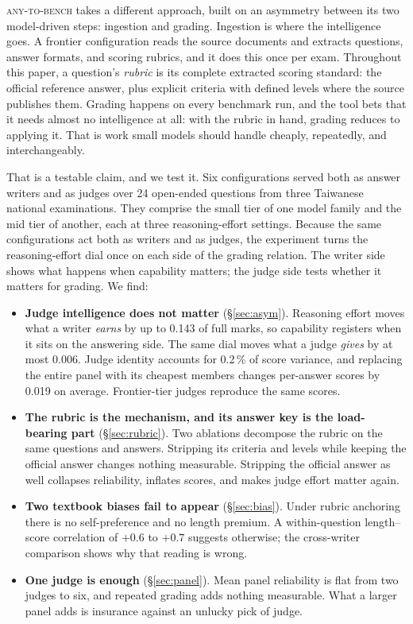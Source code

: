 \documentclass{article}
\begin{document}
\textsc{any-to-bench} takes a different approach, built on an asymmetry
between its two model-driven steps: ingestion and grading. Ingestion is where
the intelligence goes. A frontier configuration reads the source documents and
extracts questions, answer formats, and scoring rubrics, and it does this
once per exam. Throughout this paper, a question's \emph{rubric} is its
complete extracted scoring standard: the official reference answer, plus
explicit criteria with defined levels where the source publishes them. Grading happens on every benchmark run, and the tool
bets that it needs almost no intelligence at all: with the rubric in hand,
grading reduces to applying it. That is work small models should handle
cheaply, repeatedly, and interchangeably.

That is a testable claim, and we test it. Six configurations served
both as answer writers and as judges over 24 open-ended questions from three
Taiwanese national examinations. They comprise the small tier of one model
family and the mid tier of another, each at three reasoning-effort settings.
Because the same configurations act both as writers and as judges, the
experiment turns the reasoning-effort dial once on each side of the grading
relation. The writer side shows what happens when capability matters; the
judge side tests whether it matters for grading. We find:

\begin{itemize}\setlength\itemsep{0.1em}
\item \textbf{Judge intelligence does not matter} (\S\ref{sec:asym}).
Reasoning effort moves what a writer \emph{earns} by up to 0.143 of full
marks, so capability registers when it sits on the answering side. The same
dial moves what a judge \emph{gives} by at most 0.006. Judge identity
accounts for 0.2\,\% of score variance, and replacing the entire panel with
its cheapest members changes per-answer scores by 0.019 on average.
Frontier-tier judges reproduce the same scores.
\item \textbf{The rubric is the mechanism, and its answer key is the
load-bearing part} (\S\ref{sec:rubric}). Two ablations decompose the rubric
on the same questions and answers. Stripping its criteria and levels while
keeping the official answer changes nothing measurable. Stripping the
official answer as well collapses reliability, inflates scores, and makes
judge effort matter again.
\item \textbf{Two textbook biases fail to appear} (\S\ref{sec:bias}). Under
rubric anchoring there is no self-preference and no length premium. A
within-question length--score correlation of $+0.6$ to $+0.7$ suggests
otherwise; the cross-writer comparison shows why that reading is wrong.
\item \textbf{One judge is enough} (\S\ref{sec:panel}). Mean panel reliability
is flat from two judges to six, and repeated grading adds nothing measurable.
What a larger panel adds is insurance against an unlucky pick of judge.
\end{itemize}
\end{document}
